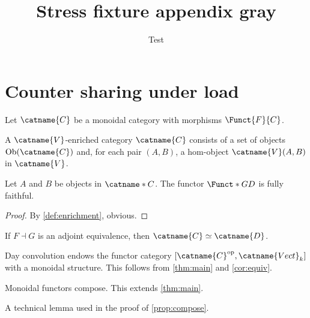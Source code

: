 \documentclass{article}
\title{Stress fixture appendix gray}
\author{Test}
\date{}
\numberwithin{equation}{section}
\begin{document}
\START
\maketitle

\section{Counter sharing under load}
\label{sec:counters}

Let $\catname{C}$ be a monoidal category with morphisms $\Funct{F}{C}$.

\begin{definition}\label{def:enrichment}
A $\catname{V}$-enriched category $\catname{C}$ consists of a set of
objects $\mathrm{Ob}(\catname{C})$ and, for each pair $(A,B)$, a hom-object
$\catname{V}(A,B)$ in $\catname{V}$.
%
\end{definition}

\begin{theorem}\label{thm:main}
Let $A$ and $B$ be objects in $\catname*{C}$.  The functor
$\Funct*{G}{D}$ is fully faithful.
\end{theorem}

\begin{proof}
By \cref{def:enrichment}, obvious.
\end{proof}

\begin{corollary}\label{cor:equiv}
If $F \dashv G$ is an adjoint equivalence, then
$\catname{C} \simeq \catname{D}$.
\end{corollary}

\begin{remark}\label{rem:day}
Day convolution endows the functor category
$[\catname{C}^{\mathrm{op}}, \catname{Vect}_k]$ with a monoidal structure.
This follows from \cref{thm:main} and \cref{cor:equiv}.
\end{remark}

\begin{proposition}\label{prop:compose}
Monoidal functors compose.  This extends \cref{thm:main}.
\end{proposition}

\begin{lemma}\label{lem:technical}
A technical lemma used in the proof of \cref{prop:compose}.
\end{lemma}
\end{document}
